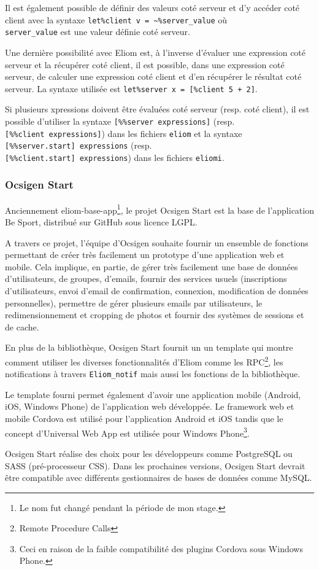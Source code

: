 Il est également possible de définir des valeurs coté serveur et d'y accéder
coté client avec la syntaxe \verb|let%client v = ~%server_value| où \\
\verb|server_value| est une valeur définie coté serveur.

Une dernière possibilité avec Eliom est, à l'inverse d'évaluer une expression
coté serveur et la récupérer coté client, il est possible, dans une expression
coté serveur, de calculer une expression coté client et d'en récupérer le
résultat coté serveur.
La syntaxe utilisée est \verb|let%server x = [%client 5 + 2]|.

Si plusieurs xpressions doivent être évaluées coté serveur (resp. coté client),
il est possible d'utiliser la syntaxe \verb|[%%server expressions]| (resp. \\
\verb|[%%client expressions]|) dans les fichiers \verb|eliom| et la syntaxe \\
\verb|[%%server.start] expressions| (resp. \\ \verb|[%%client.start] expressions|)
dans les fichiers \verb|eliomi|.

\subsubsection{Ocsigen Start}

Anciennement eliom-base-app\footnote{Le nom fut changé pendant la période de
  mon stage.}, le projet Ocsigen Start\cite{ocsigen-start-github} est la base de
l'application Be Sport, distribué sur GitHub sous licence LGPL.

A travers ce projet, l'équipe d'Ocsigen souhaite fournir un ensemble de
fonctions permettant de créer très facilement un prototype d'une application web
et mobile. Cela implique, en partie, de gérer très facilement une base de
données d'utilisateurs, de groupes, d'emails, fournir des services usuels
(inscriptions d'utilisateurs, envoi d'email de confirmation, connexion,
modification de données personnelles), permettre de gérer plusieurs emails par
utilisateurs, le redimensionnement et cropping de photos et fournir des systèmes
de sessions et de cache.

En plus de la bibliothèque, Ocsigen Start fournit un un template qui montre
comment utiliser les diverses fonctionnalités d'Eliom comme les
RPC\footnote{Remote Procedure Calls}, les notifications à travers
\verb|Eliom_notif| mais aussi les fonctions de la bibliothèque.

Le template fourni permet également d'avoir une application mobile (Android,
iOS, Windows Phone) de l'application web développée. Le framework web et mobile
Cordova est utilisé pour l'application Android et iOS tandis que le concept
d'Universal Web App est utilisée pour Windows Phone\footnote{Ceci en raison de
  la faible compatibilité des plugins Cordova sous Windows Phone.}.

Ocsigen Start réalise des choix pour les développeurs comme PostgreSQL ou SASS
(pré-processeur CSS).
Dans les prochaines versions, Ocsigen Start devrait être compatible avec
différents gestionnaires de bases de données comme MySQL.